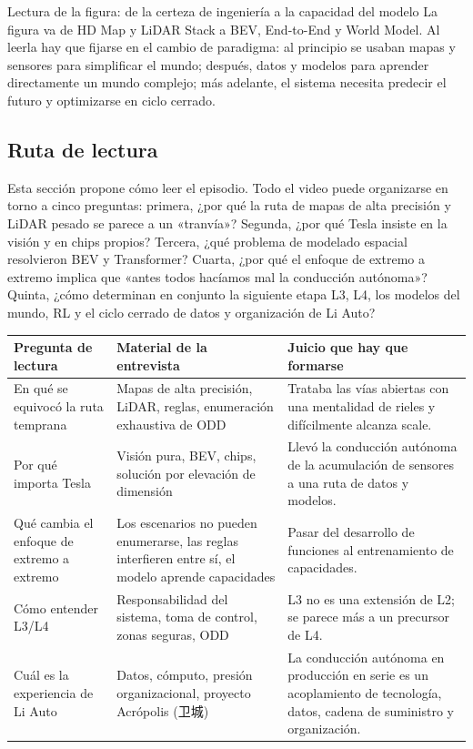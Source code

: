 \begin{knowledgebox}{Lectura de la figura: de la certeza de ingeniería a la capacidad del modelo}
La figura va de HD Map y LiDAR Stack a BEV, End-to-End y World Model. Al leerla hay que fijarse en el cambio de paradigma: al principio se usaban mapas y sensores para simplificar el mundo; después, datos y modelos para aprender directamente un mundo complejo; más adelante, el sistema necesita predecir el futuro y optimizarse en ciclo cerrado.
\end{knowledgebox}

\subsection{Ruta de lectura}

Esta sección propone cómo leer el episodio. Todo el video puede organizarse en torno a cinco preguntas: primera, ¿por qué la ruta de mapas de alta precisión y LiDAR pesado se parece a un «tranvía»? Segunda, ¿por qué Tesla insiste en la visión y en chips propios? Tercera, ¿qué problema de modelado espacial resolvieron BEV y Transformer? Cuarta, ¿por qué el enfoque de extremo a extremo implica que «antes todos hacíamos mal la conducción autónoma»? Quinta, ¿cómo determinan en conjunto la siguiente etapa L3, L4, los modelos del mundo, RL y el ciclo cerrado de datos y organización de Li Auto?

\noindent\begin{tabularx}{\textwidth}{p{}p{}X}
\toprule
Pregunta de lectura & Material de la entrevista & Juicio que hay que formarse \\
\midrule
En qué se equivocó la ruta temprana & Mapas de alta precisión, LiDAR, reglas, enumeración exhaustiva de ODD & Trataba las vías abiertas con una mentalidad de rieles y difícilmente alcanza scale. \\
Por qué importa Tesla & Visión pura, BEV, chips, solución por elevación de dimensión & Llevó la conducción autónoma de la acumulación de sensores a una ruta de datos y modelos. \\
Qué cambia el enfoque de extremo a extremo & Los escenarios no pueden enumerarse, las reglas interfieren entre sí, el modelo aprende capacidades & Pasar del desarrollo de funciones al entrenamiento de capacidades. \\
Cómo entender L3/L4 & Responsabilidad del sistema, toma de control, zonas seguras, ODD & L3 no es una extensión de L2; se parece más a un precursor de L4. \\
Cuál es la experiencia de Li Auto & Datos, cómputo, presión organizacional, proyecto Acrópolis (卫城) & La conducción autónoma en producción en serie es un acoplamiento de tecnología, datos, cadena de suministro y organización. \\
\bottomrule
\end{tabularx}

